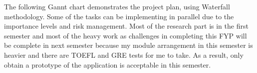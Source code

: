 \documentclass[12pt, a4paper, twoside]{extarticle}
\begin{document}

The following Gannt chart demonstrates the project plan, using Waterfall methodology. Some of the tasks can be implementing in parallel due to the importance levels and risk management. Most of the research part is in the first semester and most of the heavy work as challenges in completing this FYP will be complete in next semester because my module arrangement in this semester is heavier and there are TOEFL and GRE tests for me to take. As a result, only obtain a prototype of the application is acceptable in this semester.

\end{document}
